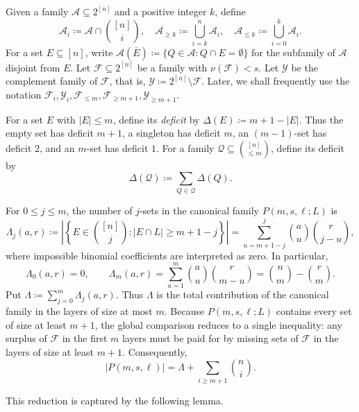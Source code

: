\documentclass[10pt,a4paper]{article}
\numberwithin{equation}{section}
\newtheorem{lemma}[lemma]{Lemma}
\theoremstyle{definition}
\newcommand{\F}{\mathcal F}
\newcommand{\Y}{\mathcal Y}
\begin{document}
Given a family $\mathcal A\subseteq 2^{[n]}$ and a positive integer $k$, define
\begin{equation*}%
    \mathcal A_i\coloneqq  \mathcal A\cap\binom{[n]}i,
    \quad
    \mathcal A_{\ge k}\coloneqq \bigcup_{i=k}^n \mathcal A_i,
    \quad
    \mathcal A_{\le k}\coloneqq \bigcup_{i=0}^k \mathcal A_i.
\end{equation*}
For a set $E\subseteq[n]$, write $\mathcal A(\overline E)
    \coloneqq
    \{Q\in\mathcal A:Q\cap E=\emptyset\}$ for the subfamily of $\mathcal A$ disjoint from $E$.
Let $\F\subseteq2^{[n]}$ be a family with $\nu(\F)<s$.
Let $\Y$ be the complement family of $\F$, that is, $\Y\coloneqq 2^{[n]}\setminus \F$.
Later, we shall frequently use the notation $\F_i,\Y_i,\F_{\le m},\F_{\ge m+1},\Y_{\ge m+1}$.


For a set $E$ with $|E|\le m$, define its \emph{deficit} by
\(\Delta(E) \coloneqq m+1-|E|.\)
Thus the empty set has deficit $m+1$, a singleton has deficit $m$, an
$(m-1)$-set has deficit $2$, and an $m$-set has deficit $1$.
For a family $\mathcal Q\subseteq\binom{[n]}{\le m}$, define its deficit by
\[
    \Delta(\mathcal Q)\coloneqq\sum_{Q\in\mathcal Q}\Delta(Q).
\]

For $0\le j\le m$, the number of $j$-sets in the canonical family $P(m,s,\ell;L)$ is
\[
    \Lambda_j(a,r)
    \coloneqq
    \left|
    \left\{E\in\binom{[n]}j: |E\cap L|\ge m+1-j\right\}
    \right|
    =
    \sum_{u=m+1-j}^{j}\binom au\binom r{j-u},
\]
where impossible binomial coefficients are interpreted as zero.  In particular,
\[
    \Lambda_0(a,r)=0,
    \qquad
    \Lambda_m(a,r)=\sum_{u=1}^{m}\binom au\binom r{m-u}
    =\binom nm-\binom rm.
\]
Put $\Lambda \coloneqq \sum_{j=0}^{m}\Lambda_j(a,r)$.
Thus $\Lambda$ is the total contribution of the canonical family in the layers of size at most $m$.
Because $P(m,s,\ell;L)$ contains every set of size at least $m+1$, the global comparison reduces to a single inequality: any surplus of $\F$ in the first $m$ layers must be paid for by missing sets of $\F$ in the layers of size at least $m+1$.
Consequently,
\[
    |P(m,s,\ell)|=
    \Lambda+
    \sum_{i\ge m+1}\binom ni.
\]


This reduction is captured by the following lemma.

\end{document}
